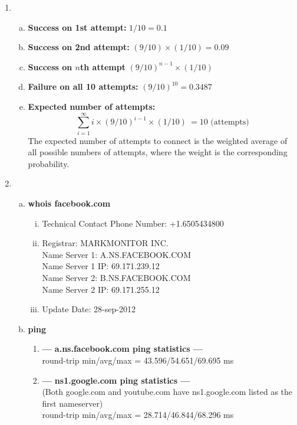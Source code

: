 \documentclass[11pt]{article}
\begin{document}
\begin{enumerate}[1]
\item %
  \begin{enumerate}[(a)]
    \item \textbf{Success on 1st attempt:} 
      $1/10 = 0.1$
    \item \textbf{Success on 2nd attempt:}  
      $(9/10) \times (1/10) = 0.09$
    \item \textbf{Success on $n$th attempt}
      $(9/10)^{n-1} \times (1/10)$
    \item \textbf{Failure on all 10 attempts:} 
      $(9/10)^{10} = 0.3487$
    \item \textbf{Expected number of attempts:} 
      \begin{equation}
        \sum_{i=1}^{\infty} i \times (9/10)^{i-1} \times (1/10)\ = 10 \text{ (attempts)}
      \end{equation}
      The expected number of attempts to connect is the weighted average of all possible numbers of attempts, where the weight is the corresponding probability.
  \end{enumerate}

\item %
\begin{enumerate}[(a)]
  \item \textbf{whois facebook.com}
  \begin{enumerate}[i)]
    \item Technical Contact Phone Number: +1.6505434800
    \item Registrar: MARKMONITOR INC. \\
      Name Server 1: A.NS.FACEBOOK.COM \\
      Name Server 1 IP: 69.171.239.12 \\
      Name Server 2: B.NS.FACEBOOK.COM \\
      Name Server 2 IP: 69.171.255.12
    \item Update Date: 28-sep-2012
  \end{enumerate}
  
  \item \textbf{ping}
    \begin{enumerate}[]
      \item
        \textbf{--- a.ns.facebook.com ping statistics ---} \\
        round-trip min/avg/max = 43.596/54.651/69.695 ms \\
      \item
        \textbf{--- ns1.google.com ping statistics ---} \\
        (Both google.com and youtube.com have ns1.google.com listed as the first nameserver) \\
        round-trip min/avg/max = 28.714/46.844/68.296 ms \\
    \end{enumerate}


\end{enumerate}
\end{enumerate}
\end{document}
